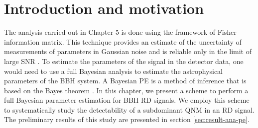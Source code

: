 \newcommand{\Msun}{\ensuremath{\mathrm{M}_\odot}}
\newcommand{\al}{\alpha}
\newcommand{\ddat}{\boldsymbol{\mathcal{D}}} 
\newcommand{\pp}{\mathcal{P}} 
\newcommand{\tth}{\boldsymbol{\vartheta}} 
\newcommand{\mdl}{\mathcal{H}} 
\newcommand{\amp}{\mathcal{A_{lm}}} 
\newcommand{\sig}{\boldsymbol{\mathcal{S}}} 
\newcommand{\nn}{\boldsymbol{\mathcal{N}}}


\section{Introduction and motivation}

The analysis carried out in Chapter 5 is done using the framework of Fisher information matrix. This technique provides an estimate of the uncertainty of measurements of parameters in Gaussian noise and is reliable only in the limit of large SNR \cite{2008PhRvD..77d2001V}. To estimate the parameters of the signal in the detector data, one would need to use a full Bayesian analysis to estimate the astrophysical parameters of the BBH system. A Bayesian PE is a method of inference that is based on the Bayes theorem \cite{BayesBooks1,BayesBooks2}. In this chapter, we present a scheme to perform a full Bayesian parameter estimation for BBH RD signals. We employ this scheme to systematically study the detectability of a subdominant QNM in an RD signal. The preliminary results of this study are presented in section \ref{sec:result-ana-pe}. 





